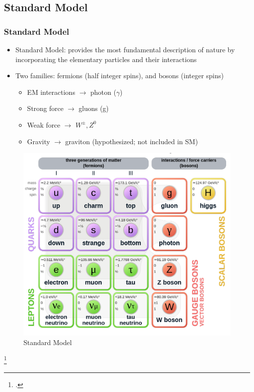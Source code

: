 \documentclass[10pt]{beamer}
\begin{document}
\subsection{Standard Model}
\begin{frame}
\frametitle{Standard Model}
\begin{minipage}{0.5\textwidth}
\begin{itemize}
\item Standard Model: provides the most fundamental description of nature by incorporating the elementary particles and their interactions
\item Two families: fermions (half integer spins), and bosons (integer spins)
\begin{itemize}
\item EM interactions $\rightarrow$ photon ($\gamma$)
\item Strong force $\rightarrow$ gluons (g) 
\item Weak force $\rightarrow$ $W^{\pm}, Z^{0}$ 
\item Gravity $\rightarrow$ graviton (hypothesized; not included in SM)
\end{itemize}
\end{itemize}
\end{minipage}\hspace{2em}
\begin{minipage}{0.35\textwidth}
      \begin{figure}
      \centering
        \includegraphics[height=\textwidth]{Standard_Model_of_Elementary_Particles}
        \caption{Standard Model \footnotemark{}}
      \end{figure}
  \end{minipage}\hfill
  \footcitetext{stdmodel}
\end{frame}
\end{document}
